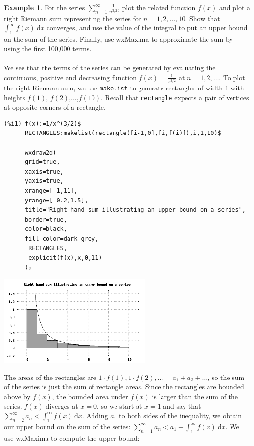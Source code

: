 \documentclass[10.5pt,twoside]{report}
\theoremstyle{definition}
\newtheorem{exmp}{Example}[section]
\begin{document}
\begin{exmp} For the series $\sum_{n=1}^{\infty} \frac{1}{n^{3/2}}$, plot the related function $f(x)$ and plot a right Riemann sum representing the series for $n=1,2,\dots ,10$.  Show that $\displaystyle \int_{1}^{\infty} f(x)\ \mathrm{d}x$ converges, and use the value of the integral to put an upper bound on the sum of the series.  Finally, use wxMaxima to approximate the sum by using the first 100,000 terms.\\
${}$\\
We see that the terms of the series can be generated by evaluating the continuous, positive and decreasing function $f(x)=\frac{1}{x^{3/2}}$ at $n=1,2,\dots$.  To plot the right Riemann sum, we use \verb|makelist| to generate rectangles of width 1 with heights $f(1)$, $f(2)$,...,$f(10)$.  Recall that \verb|rectangle| expects a pair of vertices at opposite corners of a rectangle.

\begin{verbatim}
(%i1) f(x):=1/x^(3/2)$
      RECTANGLES:makelist(rectangle([i-1,0],[i,f(i)]),i,1,10)$
      
      wxdraw2d(
      grid=true,
      xaxis=true,
      yaxis=true,
      xrange=[-1,11],
      yrange=[-0.2,1.5],
      title="Right hand sum illustrating an upper bound on a series",
      border=true,
      color=black,
      fill_color=dark_grey,
       RECTANGLES,
       explicit(f(x),x,0,11)
      );
\end{verbatim}

\includegraphics[width=3in]{example_6_3_1_1}

The areas of the rectangles are $1\cdot f(1),1\cdot f(2),\dots = a_1+a_2+\dots$, so the sum of the series is just the sum of rectangle areas.  Since the rectangles are bounded above by $f(x)$, the bounded area under $f(x)$ is larger than the sum of the series.  $f(x)$ diverges at $x=0$, so we start at $x=1$ and say that $ \sum_{n=2}^{\infty} a_n < \displaystyle \int_{1}^{\infty} f(x)\ \mathrm{d}x$.  Adding $a_1$ to both sides of the inequality, we obtain our upper bound on the sum of the series:  $ \sum_{n=1}^{\infty} a_n < a_1 + \displaystyle \int_{1}^{\infty} f(x)\ \mathrm{d}x$.  We use wxMaxima to compute the upper bound:



\end{exmp}
\end{document}
